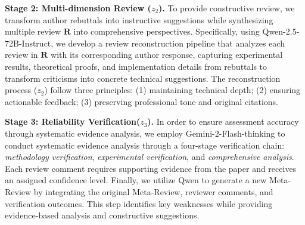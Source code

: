 \documentclass{article}
\begin{document}
\textbf{Stage 2: Multi-dimension Review ($z_2$).} To provide constructive review, we transform author rebuttals into instructive suggestions while synthesizing multiple review $\mathbf{R}$ into comprehensive perspectives. Specifically, using Qwen-2.5-72B-Instruct, we develop a review reconstruction pipeline that analyzes each review in $\mathbf{R}$ with its corresponding author response, capturing experimental results, theoretical proofs, and implementation details from rebuttals to transform criticisms into concrete technical suggestions. The reconstruction process ($z_2$) follow three principles: (1) maintaining technical depth; (2) ensuring actionable feedback; (3) preserving professional tone and original citations. 

\textbf{Stage 3: Reliability Verification($z_3$).} In order to ensure assessment accuracy through systematic evidence analysis, we employ Gemini-2-Flash-thinking to conduct systematic evidence analysis through a four-stage verification chain:   \textit{methodology verification}, \textit{experimental verification}, and \textit{comprehensive analysis}. Each review comment requires supporting evidence from the paper and receives an assigned confidence level. Finally, we utilize Qwen to generate a new Meta-Review by integrating the original Meta-Review, reviewer comments, and verification outcomes. This step identifies key weaknesses while providing evidence-based analysis and constructive suggestions.
\end{document}
